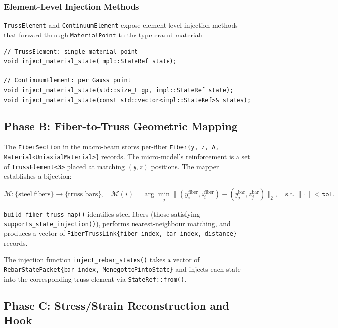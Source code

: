 \subsubsection{Element-Level Injection Methods}

\texttt{TrussElement} and \texttt{ContinuumElement} expose
element-level injection methods that forward through
\texttt{MaterialPoint} to the type-erased material:

\begin{lstlisting}
// TrussElement: single material point
void inject_material_state(impl::StateRef state);

// ContinuumElement: per Gauss point
void inject_material_state(std::size_t gp, impl::StateRef state);
void inject_material_state(const std::vector<impl::StateRef>& states);
\end{lstlisting}


\subsection{Phase B: Fiber-to-Truss Geometric Mapping}
\label{ssec:phase-b-fiber-truss}

The \texttt{FiberSection} in the macro-beam stores per-fiber
\texttt{Fiber\{y, z, A, Material<UniaxialMaterial>\}} records.  The
micro-model's reinforcement is a set of \texttt{TrussElement<3>}
placed at matching $(y, z)$ positions.  The mapper establishes a
bijection:

\[
  \mathcal{M}: \{\text{steel fibers}\} \to \{\text{truss bars}\},
  \quad
  \mathcal{M}(i) = \arg\min_{j} \|
    (y^{\text{fiber}}_i, z^{\text{fiber}}_i) -
    (y^{\text{bar}}_j, z^{\text{bar}}_j)
  \|_2,
  \quad
  \text{s.t.}\ \|\cdot\| < \texttt{tol}.
\]

\texttt{build\_fiber\_truss\_map()} identifies steel fibers (those
satisfying \texttt{supports\_state\_injection()}), performs
nearest-neighbour matching, and produces a vector of
\texttt{FiberTrussLink\{fiber\_index, bar\_index, distance\}} records.

The injection function \texttt{inject\_rebar\_states()} takes a vector
of \texttt{RebarStatePacket\{bar\_index, MenegottoPintoState\}} and
injects each state into the corresponding truss element via
\texttt{StateRef::from()}.


\subsection{Phase C: Stress/Strain Reconstruction and Hook}
\label{ssec:phase-c-reconstruction}

